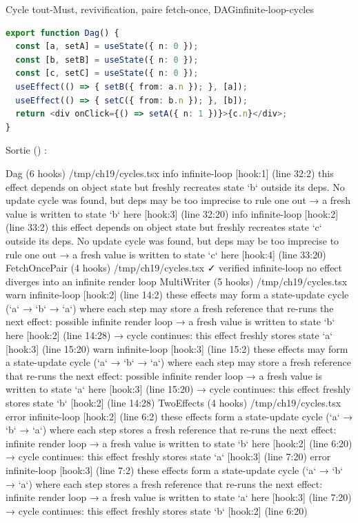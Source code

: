 \begin{exemple}{Cycle tout-Must, revivification, paire fetch-once, DAG}{infinite-loop-cycles}
\begin{lstlisting}[language=TypeScript,caption={\file{/tmp/ch19/cycles.tsx}},label={lst:infinite-loop-cycles}]
export function Dag() {
  const [a, setA] = useState({ n: 0 });
  const [b, setB] = useState({ n: 0 });
  const [c, setC] = useState({ n: 0 });
  useEffect(() => { setB({ from: a.n }); }, [a]);
  useEffect(() => { setC({ from: b.n }); }, [b]);
  return <div onClick={() => setA({ n: 1 })}>{c.n}</div>;
}
\end{lstlisting}
Sortie () :
\begin{sortie}
  Dag  (6 hooks)  /tmp/ch19/cycles.tsx
    info   infinite-loop  [hook:1]  (line 32:2)  this effect depends on object state but freshly recreates state `b` outside its deps. No update cycle was found, but deps may be too imprecise to rule one out
       → a fresh value is written to state `b` here [hook:3] (line 32:20)
    info   infinite-loop  [hook:2]  (line 33:2)  this effect depends on object state but freshly recreates state `c` outside its deps. No update cycle was found, but deps may be too imprecise to rule one out
       → a fresh value is written to state `c` here [hook:4] (line 33:20)
  FetchOncePair  (4 hooks)  /tmp/ch19/cycles.tsx  ✓
    verified  infinite-loop  no effect diverges into an infinite render loop
  MultiWriter  (5 hooks)  /tmp/ch19/cycles.tsx
    warn   infinite-loop  [hook:2]  (line 14:2)  these effects may form a state-update cycle (`a` → `b` → `a`) where each step may store a fresh reference that re-runs the next effect: possible infinite render loop
       → a fresh value is written to state `b` here [hook:2] (line 14:28)
       → cycle continues: this effect freshly stores state `a` [hook:3] (line 15:20)
    warn   infinite-loop  [hook:3]  (line 15:2)  these effects may form a state-update cycle (`a` → `b` → `a`) where each step may store a fresh reference that re-runs the next effect: possible infinite render loop
       → a fresh value is written to state `a` here [hook:3] (line 15:20)
       → cycle continues: this effect freshly stores state `b` [hook:2] (line 14:28)
  TwoEffects  (4 hooks)  /tmp/ch19/cycles.tsx
    error  infinite-loop  [hook:2]  (line 6:2)  these effects form a state-update cycle (`a` → `b` → `a`) where each step stores a fresh reference that re-runs the next effect: infinite render loop
       → a fresh value is written to state `b` here [hook:2] (line 6:20)
       → cycle continues: this effect freshly stores state `a` [hook:3] (line 7:20)
    error  infinite-loop  [hook:3]  (line 7:2)  these effects form a state-update cycle (`a` → `b` → `a`) where each step stores a fresh reference that re-runs the next effect: infinite render loop
       → a fresh value is written to state `a` here [hook:3] (line 7:20)
       → cycle continues: this effect freshly stores state `b` [hook:2] (line 6:20)
\end{sortie}
\end{exemple}

